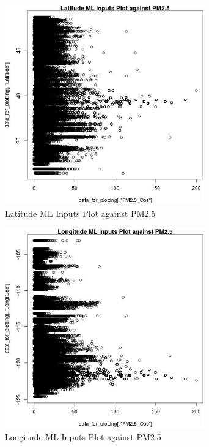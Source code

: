 \begin{figure} 
\centering  
\includegraphics[width=0.77\textwidth]{Code_Outputs/ML_input_report_ML_input_PM25_Step5_part_d_de_duplicated_aves_ML_input_LatitudevPM25_Obs.jpg} 
\caption{\label{fig:ML_input_report_ML_input_PM25_Step5_part_d_de_duplicated_aves_ML_inputLatitudevPM25_Obs}Latitude ML Inputs Plot against PM2.5} 
\end{figure} 
 

\begin{figure} 
\centering  
\includegraphics[width=0.77\textwidth]{Code_Outputs/ML_input_report_ML_input_PM25_Step5_part_d_de_duplicated_aves_ML_input_LongitudevPM25_Obs.jpg} 
\caption{\label{fig:ML_input_report_ML_input_PM25_Step5_part_d_de_duplicated_aves_ML_inputLongitudevPM25_Obs}Longitude ML Inputs Plot against PM2.5} 
\end{figure} 
 

